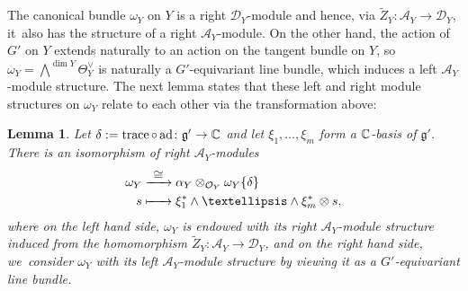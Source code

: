 \documentclass[11pt]{article}
\newcommand{\To}[1]{\mathchoice{\xrightarrow{\textstyle\kern4pt#1\kern3pt}}{\xrightarrow{\,#1\,}}{}{}}
\newcommand\Mto[1]{\mathrel{\mapstochar\To{#1}}}
\newtheorem{lem}[thm]{Lemma}
\newcommand{\cA}{\mathscr{A}}
\newcommand{\frg}{\mathfrak{g}}
\DeclareMathOperator{\ad}{ad}
\DeclareMathOperator{\trace}{trace}
\begin{document}
The canonical bundle $\omega_Y$ on $Y$ is a right $\mathscr{D}_Y$\nobreakdash-mod\-ule and hence, via $\tilde Z_Y \colon \cA_Y \to \mathscr D_Y$, it~also has the structure of a right $\cA_Y$\nobreakdash-mod\-ule. On the other hand, the action of $G'$ on $Y$ extends naturally to an action on the tangent bundle on $Y$, so~$\omega_Y = \bigwedge^{\dim Y} \Theta_Y^\vee$ is naturally a $G'$-equivariant line bundle, which induces a left $\cA_Y$\nobreakdash-mod\-ule structure. The next lemma states that these left and right module structures on $\omega_Y$ relate to each other via the transformation above:

\begin{lem} \label{lem:rightAModuleStructuresOnOmega}
Let $\delta := \trace \circ \ad \colon \frg' \to \C$ and let $\xi_1,\dots,\xi_m$ form a ${\mathbb C}$-basis of $\frg'$. There is an isomorphism of right $\cA_Y$\nobreakdash-mod\-ules
\begin{align*}
\omega_Y &\To{\cong} \alpha_Y \otimes_{\O_Y} \omega_Y\{\delta\} \\
s &\Mto{\hphantom{\cong}} \xi_1^* \wedge \dots \wedge \xi_m^* \otimes s,
\end{align*}
where on the left hand side, $\omega_Y$ is endowed with its right $\cA_Y$\nobreakdash-mod\-ule structure induced from the homomorphism $\tilde Z_Y \colon \cA_Y \to \mathscr D_Y$, and on the right hand side, we~consider $\omega_Y$ with its left $\cA_Y$\nobreakdash-mod\-ule structure by viewing it as a $G'$-equivariant line bundle.
\end{lem}
\end{document}
